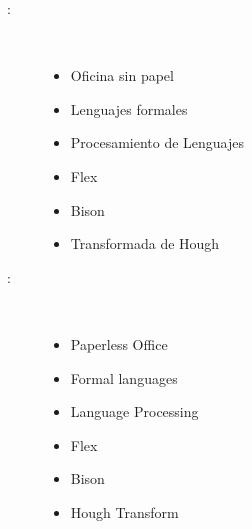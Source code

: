 \begin{multicols}{2}
\begin{description}
\item [\palabraschaveprincipal:] \mbox{} \\[-20pt]
  \begin{itemize}
      \item Oficina sin papel 
      \item Lenguajes formales
      \item Procesamiento de Lenguajes
      \item Flex
      \item Bison
      \item Transformada de Hough
  \end{itemize}
\end{description}
\begin{description}
\item [\palabraschavesecundaria:] \mbox{} \\[-20pt]
  \begin{itemize}
      \item Paperless Office
      \item Formal languages
      \item Language Processing      
      \item Flex
      \item Bison
      \item Hough Transform
  \end{itemize}

\end{description}
\end{multicols}
